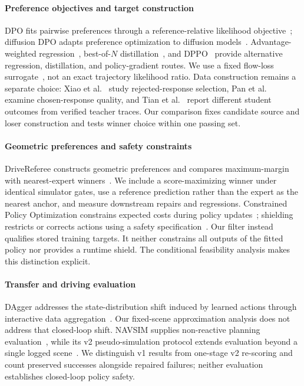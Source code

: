 \documentclass[letterpaper,10pt,conference]{ieeeconf}
\begin{document}
\paragraph{Preference objectives and target construction}
DPO fits pairwise preferences through a reference-relative likelihood objective~\cite{dpo}; diffusion DPO adapts preference optimization to diffusion models~\cite{diffdpo}. Advantage-weighted regression~\cite{awr}, best-of-$N$ distillation~\cite{bond}, and DPPO~\cite{dppo} provide alternative regression, distillation, and policy-gradient routes. We use a fixed flow-loss surrogate~\cite{flowmatching,diffdpo}, not an exact trajectory likelihood ratio. Data construction remains a separate choice: Xiao et al.~\cite{sweetspot} study rejected-response selection, Pan et al.~\cite{whatmatters} examine chosen-response quality, and Tian et al.~\cite{correctanswers} report different student outcomes from verified teacher traces. Our comparison fixes candidate source and loser construction and tests winner choice within one passing set.

\paragraph{Geometric preferences and safety constraints}
DriveReferee constructs geometric preferences and compares maximum-margin with nearest-expert winners~\cite{drivereferee}. We include a score-maximizing winner under identical simulator gates, use a reference prediction rather than the expert as the nearest anchor, and measure downstream repairs and regressions. Constrained Policy Optimization constrains expected costs during policy updates~\cite{cpo}; shielding restricts or corrects actions using a safety specification~\cite{shielding}. Our filter instead qualifies stored training targets. It neither constrains all outputs of the fitted policy nor provides a runtime shield. The conditional feasibility analysis makes this distinction explicit.

\paragraph{Transfer and driving evaluation}
DAgger addresses the state-distribution shift induced by learned actions through interactive data aggregation~\cite{dagger}. Our fixed-scene approximation analysis does not address that closed-loop shift. NAVSIM supplies non-reactive planning evaluation~\cite{navsim}, while its v2 pseudo-simulation protocol extends evaluation beyond a single logged scene~\cite{navsimv2}. We distinguish v1 results from one-stage v2 re-scoring and count preserved successes alongside repaired failures; neither evaluation establishes closed-loop policy safety.
\end{document}
